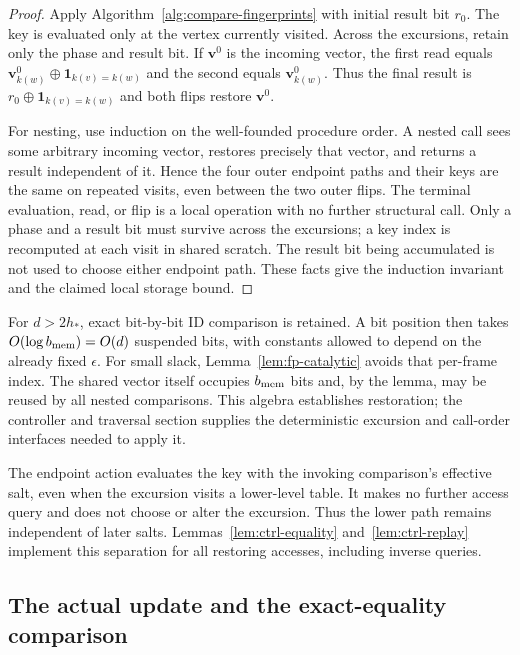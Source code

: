 \documentclass[11pt]{article}
\numberwithin{equation}{section}
\theoremstyle{definition}
\theoremstyle{remark}
\begin{document}
\begin{proof}
Apply Algorithm~\ref{alg:compare-fingerprints} with initial result bit $r_0$. The key is evaluated only at the vertex currently visited. Across the excursions, retain only the phase and result bit.  If ${\mathbf{v}}^0$ is the incoming vector, the first
read equals ${\mathbf{v}}^0_{k(w)}\mathbin\oplus\mathbf1_{k(v)=k(w)}$ and the
second equals ${\mathbf{v}}^0_{k(w)}$.  Thus the final result is
$r_0\mathbin\oplus\mathbf1_{k(v)=k(w)}$ and both flips restore ${\mathbf{v}}^0$.

For nesting, use induction on the well-founded procedure order.  A
nested call sees some arbitrary incoming vector, restores precisely
that vector, and returns a result independent of it.  Hence the four
outer endpoint paths and their keys are the same on repeated visits,
even between the two outer flips.  The terminal evaluation, read, or
flip is a local operation with no further structural call.  Only a
phase and a result bit must survive across the excursions; a key index
is recomputed at each visit in shared scratch.  The result bit being
accumulated is not used to choose either endpoint path.  These facts
give the induction invariant and the claimed local storage bound.
\end{proof}

For $d>2h_*$, exact bit-by-bit ID comparison is retained.  A bit position
then takes $O(\log {b_{\rm mem}})=O(d)$ suspended bits, with constants allowed to
depend on the already fixed $\epsilon$.  For small slack,
Lemma~\ref{lem:fp-catalytic} avoids that per-frame index.  The shared
vector itself occupies ${b_{\rm mem}}$ bits and, by the lemma, may be reused by all
nested comparisons.  This algebra establishes restoration; the
controller and traversal section supplies the deterministic excursion
and call-order interfaces needed to apply it.

The endpoint action evaluates the key with the invoking comparison's
effective salt, even when the excursion visits a lower-level table.
It makes no further access query and does not choose or alter the
excursion.  Thus the lower path remains independent of later salts.
Lemmas~\ref{lem:ctrl-equality} and~\ref{lem:ctrl-replay} implement this
separation for all restoring accesses, including inverse queries.


\subsection{The actual update and the exact-equality comparison}
\end{document}
